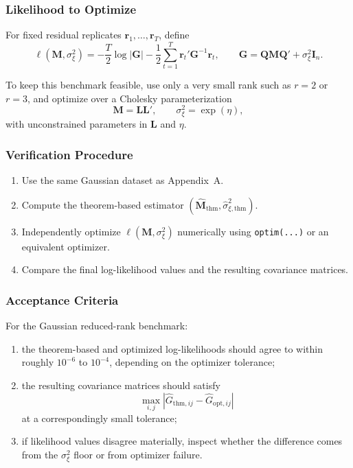 \documentclass[11pt]{article}
\newcommand{\bQ}{\mathbf{Q}}
\newcommand{\bG}{\mathbf{G}}
\newcommand{\bM}{\mathbf{M}}
\newcommand{\bL}{\mathbf{L}}
\newcommand{\br}{\mathbf{r}}
\newcommand{\I}{\mathbf{I}}
\begin{document}
\subsubsection{Likelihood to Optimize}

For fixed residual replicates \(\br_1,\ldots,\br_T\), define
\[
\ell(\bM, \sigma_\xi^2)
=
-\frac{T}{2}\log |\bG|
-\frac{1}{2}\sum_{t=1}^T \br_t' \bG^{-1}\br_t,
\qquad
\bG = \bQ \bM \bQ' + \sigma_\xi^2 \I_n.
\]

To keep this benchmark feasible, use only a very small rank such as \(r=2\) or
\(r=3\), and optimize over a Cholesky parameterization
\[
\bM = \bL \bL',
\qquad
\sigma_\xi^2 = \exp(\eta),
\]
with unconstrained parameters in \(\bL\) and \(\eta\).

\subsubsection{Verification Procedure}

\begin{enumerate}[label=\arabic*.]
\item Use the same Gaussian dataset as Appendix~A.
\item Compute the theorem-based estimator
\((\widehat{\bM}_{\mathrm{thm}}, \widehat{\sigma}_{\xi,\mathrm{thm}}^2)\).
\item Independently optimize \(\ell(\bM, \sigma_\xi^2)\) numerically using
\texttt{optim(...)} or an equivalent optimizer.
\item Compare the final log-likelihood values and the resulting covariance
matrices.
\end{enumerate}

\subsubsection{Acceptance Criteria}

For the Gaussian reduced-rank benchmark:

\begin{enumerate}[label=\arabic*.]
\item the theorem-based and optimized log-likelihoods should agree to within
roughly \(10^{-6}\) to \(10^{-4}\), depending on the optimizer tolerance;
\item the resulting covariance matrices should satisfy
\[
\max_{i,j} |\widehat G_{\mathrm{thm},ij} - \widehat G_{\mathrm{opt},ij}|
\]
at a correspondingly small tolerance;
\item if likelihood values disagree materially, inspect whether the difference
comes from the \(\sigma_{\xi}^2\) floor or from optimizer failure.
\end{enumerate}
\end{document}
